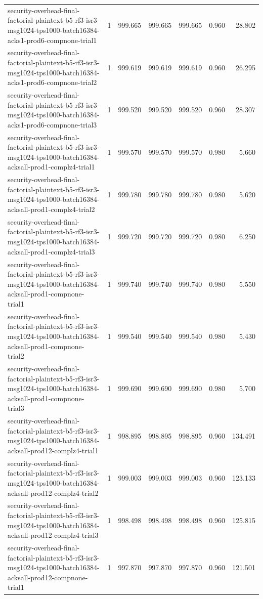 \begin{tabular}{lrrrrrr}
security-overhead-final-factorial-plaintext-b5-rf3-isr3-msg1024-tps1000-batch16384-acks1-prod6-compnone-trial1 & 1 & 999.665 & 999.665 & 999.665 & 0.960 & 28.802 \\
security-overhead-final-factorial-plaintext-b5-rf3-isr3-msg1024-tps1000-batch16384-acks1-prod6-compnone-trial2 & 1 & 999.619 & 999.619 & 999.619 & 0.960 & 26.295 \\
security-overhead-final-factorial-plaintext-b5-rf3-isr3-msg1024-tps1000-batch16384-acks1-prod6-compnone-trial3 & 1 & 999.520 & 999.520 & 999.520 & 0.960 & 28.307 \\
security-overhead-final-factorial-plaintext-b5-rf3-isr3-msg1024-tps1000-batch16384-acksall-prod1-complz4-trial1 & 1 & 999.570 & 999.570 & 999.570 & 0.980 & 5.660 \\
security-overhead-final-factorial-plaintext-b5-rf3-isr3-msg1024-tps1000-batch16384-acksall-prod1-complz4-trial2 & 1 & 999.780 & 999.780 & 999.780 & 0.980 & 5.620 \\
security-overhead-final-factorial-plaintext-b5-rf3-isr3-msg1024-tps1000-batch16384-acksall-prod1-complz4-trial3 & 1 & 999.720 & 999.720 & 999.720 & 0.980 & 6.250 \\
security-overhead-final-factorial-plaintext-b5-rf3-isr3-msg1024-tps1000-batch16384-acksall-prod1-compnone-trial1 & 1 & 999.740 & 999.740 & 999.740 & 0.980 & 5.550 \\
security-overhead-final-factorial-plaintext-b5-rf3-isr3-msg1024-tps1000-batch16384-acksall-prod1-compnone-trial2 & 1 & 999.540 & 999.540 & 999.540 & 0.980 & 5.430 \\
security-overhead-final-factorial-plaintext-b5-rf3-isr3-msg1024-tps1000-batch16384-acksall-prod1-compnone-trial3 & 1 & 999.690 & 999.690 & 999.690 & 0.980 & 5.700 \\
security-overhead-final-factorial-plaintext-b5-rf3-isr3-msg1024-tps1000-batch16384-acksall-prod12-complz4-trial1 & 1 & 998.895 & 998.895 & 998.895 & 0.960 & 134.491 \\
security-overhead-final-factorial-plaintext-b5-rf3-isr3-msg1024-tps1000-batch16384-acksall-prod12-complz4-trial2 & 1 & 999.003 & 999.003 & 999.003 & 0.960 & 123.133 \\
security-overhead-final-factorial-plaintext-b5-rf3-isr3-msg1024-tps1000-batch16384-acksall-prod12-complz4-trial3 & 1 & 998.498 & 998.498 & 998.498 & 0.960 & 125.815 \\
security-overhead-final-factorial-plaintext-b5-rf3-isr3-msg1024-tps1000-batch16384-acksall-prod12-compnone-trial1 & 1 & 997.870 & 997.870 & 997.870 & 0.960 & 121.501 \\

\end{tabular}
